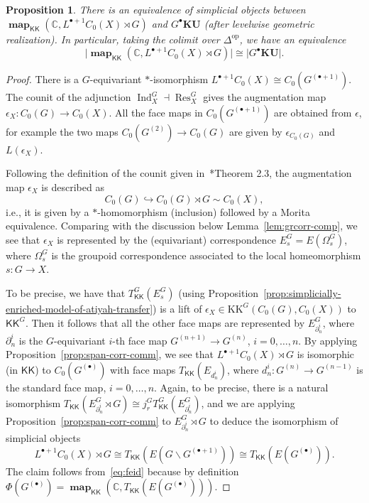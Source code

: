 \documentclass[a4paper,reqno]{amsart}
\theoremstyle{plain}
\newtheorem{proposition}[theorem]{Proposition}
\theoremstyle{definition}
\theoremstyle{remark}
\numberwithin{equation}{section}
\newcommand{\dC}{\mathbb{C}}
\newcommand{\KK}{\mathrm{KK}}
\newcommand{\icKK}{\mathsf{KK}}
\newcommand{\gr}[1]{\lvert #1\rvert}
\newcommand{\KU}{\mathbf{KU}}
\DeclareMathOperator{\Ind}{Ind}
\DeclareMathOperator{\Res}{Res}
\DeclareMathOperator{\map}{\mathbf{map}}
\begin{document}
\begin{proposition}\label{prop:id-simp-obj}
There is an equivalence of simplicial objects between $\map_{\icKK}(\dC,L^{\bullet+1} C_0(X)\rtimes G)$ and $G^{\bullet} \KU$ (after levelwise geometric realization). In particular, taking the colimit over $\Delta^{\text{op}}$, we have an equivalence
\[
\gr{\map_{\icKK}(\dC,L^{\bullet+1} C_0(X)\rtimes G)} \cong \gr{G^{\bullet}\KU}.
\]
\end{proposition}
\begin{proof}
There is a $G$-equivariant $\ast$-isomorphism $L^{\bullet+1} C_0(X)\cong C_0(G^{(\bullet+1)})$. The counit of the adjunction $\Ind_X^G\dashv \Res^G_X$ gives the augmentation map $\epsilon_X\colon C_0(G)\to C_0(X)$. All the face maps in $C_0(G^{(\bullet+1)})$ are obtained from $\epsilon$, for example the two maps $C_0(G^{(2)})\to C_0(G)$ are given by $\epsilon_{C_0(G)}$ and $L(\epsilon_X)$. 

Following the definition of the counit given in~\cite{val:kthpgrp}*{Theorem 2.3}, the augmentation map $\epsilon_X$ is described as
\[
C_0(G)\hookrightarrow C_0(G)\rtimes G \sim C_0(X),
\]
i.e., it is given by a $\ast$-homomorphism (inclusion) followed by a Morita equivalence.
Comparing with the discussion below Lemma~\ref{lem:grcorr-comp}, we see that $\epsilon_X$ is represented by the (equivariant) correspondence  $E^G_s=E(\Omega^G_s)$, where $\Omega^G_s$ is the groupoid correspondence associated to the local homeomorphism $s\colon G\to X$.

To be precise, we have that $T_\icKK^G(E^G_s)$ (using Proposition~\ref{prop:simplicially-enriched-model-of-atiyah-transfer}) is a lift of $\epsilon_X\in \KK^G(C_0(G),C_0(X))$ to $\icKK^G$. Then it follows that all the other face maps are represented by $E^G_{\partial^i_n}$, where $\partial^i_n$ is the $G$-equivariant $i$-th face map $G^{(n+1)}\to G^{(n)}$, $i=0,\dots,n$. By applying Proposition~\ref{prop:span-corr-comm}, we see that $L^{\bullet+1} C_0(X)\rtimes G$ is isomorphic (in $\icKK$) to $C_0(G^{(\bullet)})$ with face maps $T_\icKK(E_{d^i_n})$, where $d^i_n\colon G^{(n)}\to G^{(n-1)}$ is the standard face map, $i=0,\dots, n$. Again, to be precise, there is a natural isomorphism $T_\icKK(E^G_{\partial^i_n}\rtimes G)\cong  j_r^G T_\icKK^G(E^G_{\partial^i_n})$, and we are applying Proposition~\ref{prop:span-corr-comm} to $E^G_{\partial^i_n}\rtimes G$ to deduce the isomorphism of simplicial objects 
\[
L^{\bullet+1} C_0(X)\rtimes G\cong T_\icKK(E(G\backslash G^{(\bullet+1)}))\cong T_\icKK(E(G^{(\bullet)})).
\]
The claim follows from~\eqref{eq:feid} because by definition $\Phi(G^{(\bullet)})= \map_{\icKK}(\dC,T_\icKK(E(G^{(\bullet)})))$.
\end{proof}
\end{document}
